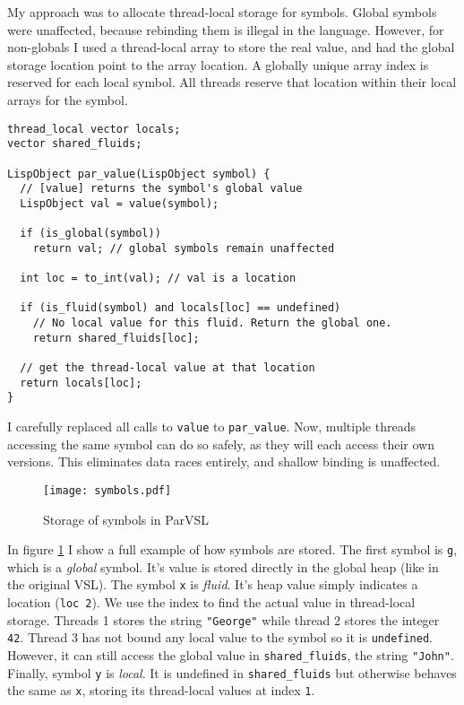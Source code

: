 My approach was to allocate thread-local storage for symbols.
Global symbols were unaffected, because rebinding them is illegal in the language.
However, for non-globals I used a thread-local array to store the real value, and had the global storage
location point to the array location. A globally unique array index is reserved for each local symbol.
All threads reserve that location within their local arrays for the symbol.

\begin{verbatim}
thread_local vector locals;
vector shared_fluids;

LispObject par_value(LispObject symbol) {
  // [value] returns the symbol's global value
  LispObject val = value(symbol);

  if (is_global(symbol))
    return val; // global symbols remain unaffected

  int loc = to_int(val); // val is a location

  if (is_fluid(symbol) and locals[loc] == undefined)
    // No local value for this fluid. Return the global one.
    return shared_fluids[loc];

  // get the thread-local value at that location
  return locals[loc];
}
\end{verbatim}

I carefully replaced all calls to \texttt{value} to \texttt{par\_value}. Now, multiple threads accessing the same symbol
can do so safely, as they will each access their own versions. This eliminates data races entirely,
and shallow binding is unaffected.

\begin{figure}[H]
  \centering
  \texttt{[image: symbols.pdf]}
  \label{fig:symbols}
  \caption{Storage of symbols in ParVSL}
\end{figure}

In figure \ref{fig:symbols} I show a full example of how symbols are stored. The first symbol is \texttt{g}, which
is a \emph{global} symbol. It's value is stored directly in the global heap (like in the original VSL). The symbol \texttt{x}
is \emph{fluid}. It's heap value simply indicates a location (\texttt{loc 2}). We use the index to find the actual value
in thread-local storage. Threads 1 stores the string \texttt{"George"} while thread 2 stores the integer \texttt{42}.
Thread 3 has not bound any local value to the symbol so it is \texttt{undefined}. However, it can still access the
global value in \verb|shared_fluids|, the string \verb|"John"|. Finally, symbol \verb|y| is \emph{local}. It is
undefined in \verb|shared_fluids| but otherwise behaves the same as \verb|x|, storing its thread-local values at
index \verb|1|.

